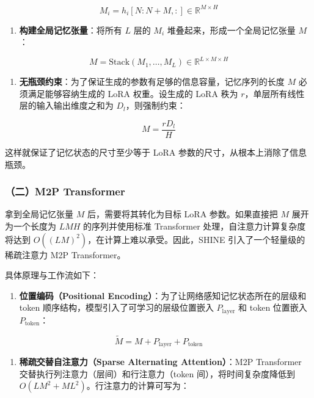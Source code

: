 \[
M_i = h_i[N:N+M,:]\in\mathbb{R}^{M\times H}
\]

\begin{enumerate}
\def\labelenumi{\arabic{enumi}.}
\setcounter{enumi}{2}
\tightlist
\item
  \textbf{构建全局记忆张量}：将所有 \(L\) 层的 \(M_i\) 堆叠起来，形成一个全局记忆张量 \(M\)：
\end{enumerate}

\[
M=\mathrm{Stack}(M_1,\ldots,M_L)\in\mathbb{R}^{L\times M\times H}
\]

\begin{enumerate}
\def\labelenumi{\arabic{enumi}.}
\setcounter{enumi}{3}
\tightlist
\item
  \textbf{无瓶颈约束}：为了保证生成的参数有足够的信息容量，记忆序列的长度 \(M\) 必须满足能够容纳生成的 LoRA 权重。设生成的 LoRA 秩为 \(r\)，单层所有线性层的输入输出维度之和为 \(D_l\)，则强制约束：
\end{enumerate}

\[
M=\frac{rD_l}{H}
\]

这样就保证了记忆状态的尺寸至少等于 LoRA 参数的尺寸，从根本上消除了信息瓶颈。

\hypertarget{ux4e8cm2p-transformer}{%
\subsubsection{（二）M2P Transformer}\label{ux4e8cm2p-transformer}}

拿到全局记忆张量 \(M\) 后，需要将其转化为目标 LoRA 参数。如果直接把 \(M\) 展开为一个长度为 \(LMH\) 的序列并使用标准 Transformer 处理，自注意力计算复杂度将达到 \(O((LM)^2)\)，在计算上难以承受。因此，SHINE 引入了一个轻量级的稀疏注意力 M2P Transformer。

具体原理与工作流如下：

\begin{enumerate}
\def\labelenumi{\arabic{enumi}.}
\tightlist
\item
  \textbf{位置编码（Positional Encoding）}：为了让网络感知记忆状态所在的层级和 token 顺序结构，模型引入了可学习的层级位置嵌入 \(P_{\mathrm{layer}}\) 和 token 位置嵌入 \(P_{\mathrm{token}}\)：
\end{enumerate}

\[
\tilde{M}=M+P_{\mathrm{layer}}+P_{\mathrm{token}}
\]

\begin{enumerate}
\def\labelenumi{\arabic{enumi}.}
\setcounter{enumi}{1}
\tightlist
\item
  \textbf{稀疏交替自注意力（Sparse Alternating Attention）}：M2P Transformer 交替执行列注意力（层间）和行注意力（token 间），将时间复杂度降低到 \(O(LM^2+ML^2)\)。行注意力的计算可写为：
\end{enumerate}

